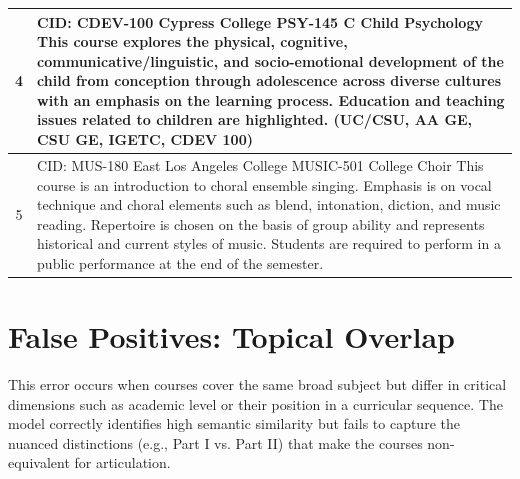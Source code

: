 {\begin{longtable}{ >{\baselineskip=12pt}c >{\baselineskip=12pt}p{} }
\midrule
4 & CID: CDEV-100 \newline
Cypress College \newline
PSY-145 C Child Psychology \newline
This course explores the physical, cognitive, communicative/linguistic, and socio-emotional development of the child from conception through adolescence across diverse cultures with an emphasis on the learning process. Education and teaching issues related to children are highlighted. (UC/CSU, AA GE, CSU GE, IGETC, CDEV 100)\\
\midrule
5 & CID: MUS-180 \newline
East Los Angeles College \newline
MUSIC-501 College Choir \newline
This course is an introduction to choral ensemble singing. Emphasis is on vocal technique and choral elements such as blend, intonation, diction, and music reading. Repertoire is chosen on the basis of group ability and represents historical and current styles of music. Students are required to perform in a public performance at the end of the semester.\\
\bottomrule
\end{longtable}
}

\section{False Positives: Topical Overlap}\label{app:topicoverlap}
This error occurs when courses cover the same broad subject but differ in critical dimensions such as academic level or their position in a curricular sequence. The model correctly identifies high semantic similarity but fails to capture the nuanced distinctions (e.g., Part I vs. Part II) that make the courses non-equivalent for articulation.

